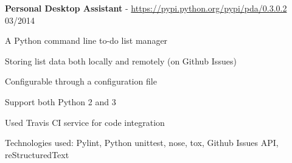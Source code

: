 \documentclass[margin,line]{resume}
\begin{document}
\begin{resume}
    \textbf{Personal Desktop Assistant} - \url{https://pypi.python.org/pypi/pda/0.3.0.2} \hfill 03/2014 \vspace{-3mm}\\\vspace{-1mm}%
      \begin{list2}
       \item A Python command line to-do list manager
       \item Storing list data both locally and remotely (on Github Issues)
       \item Configurable through a configuration file
       \item Support both Python 2 and 3
       \item Used Travis CI service for code integration
       \item Technologies used: Pylint, Python unittest, nose, tox, Github Issues API, reStructuredText
      \end{list2}


\end{resume}
\end{document}
